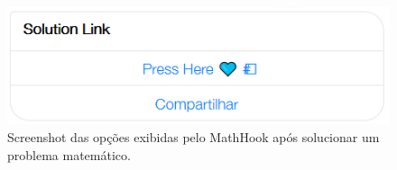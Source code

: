 \begin{figure}[h!tbp]
    \centering
    \includegraphics[width=0.7\linewidth]{img/bot1_5.png}
    \caption{Screenshot das opções exibidas pelo MathHook após solucionar um problema matemático.}
    \label{fig:bot1_5}
\end{figure}